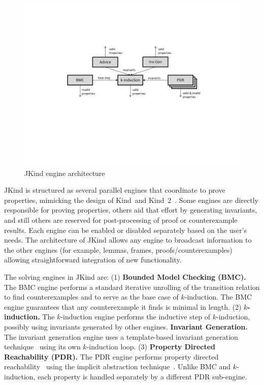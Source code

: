 \documentclass{llncs}
\newcommand{\jkind}{{\sc JKind}\xspace}
\newcommand{\kind}{{\sc Kind}\xspace}
\newcommand{\mike}[1]{\textcolor{red}{#1}}
\begin{document}
\begin{figure}
  \begin{center}
    \includegraphics[clip,trim=140 220 100 140,scale=0.6]{engines.png}
  \end{center}
  \vspace{-2em}
  \caption{\jkind engine architecture}
  \vspace{-1em}
  \label{fig:engines}
\end{figure}

\jkind is structured as several parallel engines that coordinate to
prove properties, mimicking the design of \kind\ and \kind\ 2~\cite{champion2016cav, kahsai2011pdmc}.
Some engines are directly responsible for proving properties, others aid that effort by generating invariants, and still others are reserved for post-processing of proof or counterexample results. Each engine can be enabled or disabled separately based on the user's needs. The architecture of \jkind allows any engine to broadcast information to the other engines (for example, lemmas, frames, proofs/counterexamples) allowing straightforward integration of new functionality.

The solving engines in \jkind are:  (1) \textbf{Bounded Model Checking (BMC).} The BMC engine performs a standard iterative unrolling of the transition relation to find counterexamples and to serve as the base case of $k$-induction. The BMC engine guarantees that any counterexample it finds is minimal in length. (2) \textbf{$k$-induction.} The $k$-induction engine performs the inductive step of $k$-induction, possibly using invariants generated by other engines. \textbf{Invariant Generation.} The invariant generation engine uses a template-based invariant generation technique~\cite{kahsai2012nfm} using its own $k$-induction loop. (3) \textbf{Property Directed Reachability (PDR).} The PDR engine performs property directed reachability~\cite{een2011fmcad} using the implicit abstraction technique~\cite{cimatti2014tacas}. Unlike BMC and $k$-induction, each property is handled separately by a different PDR sub-engine. %
\end{document}
